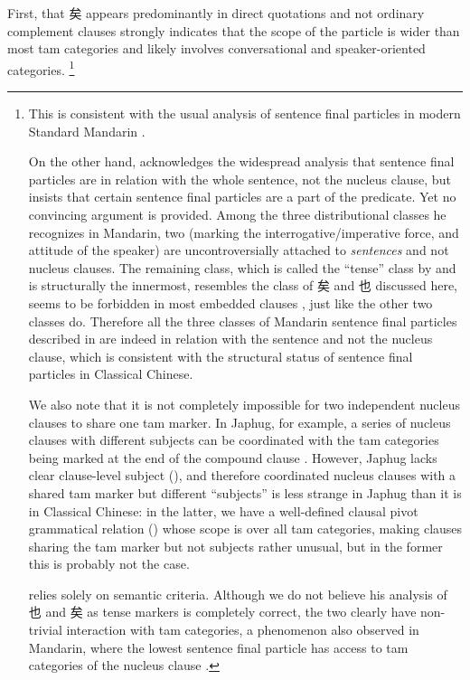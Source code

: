 \documentclass[UTF8, a4paper, oneside, scheme=plain, 12pt]{ctexrep}
\newcommand*{\citesec}[1]{\S~{#1}}
\newcommand*{\citepage}[1]{p.~{#1}}
\newcommand*{\citepages}[1]{pp.~{#1}}
\begin{document}
First, that 矣 appears predominantly in direct quotations and not ordinary complement clauses
strongly indicates that the scope of the particle is wider than most \ac{tam} categories and likely involves conversational and speaker-oriented categories.%
\footnote{
    This is consistent with the usual analysis of sentence final particles 
    in modern Standard Mandarin
    \citep{paul2014particles,pan2021sentence}.

    On the other hand, \citet[\citepage{233}]{zhudexigrammar} acknowledges the widespread analysis that sentence final particles are in relation with the whole sentence, not the nucleus clause,
    but insists that certain sentence final particles are a part of the predicate.
    Yet no convincing argument is provided.
    Among the three distributional classes he recognizes in Mandarin,
    two (marking the interrogative/imperative force, and attitude of the speaker)
    are uncontroversially attached to \emph{sentences} and not nucleus clauses.
    The remaining class, which is called the ``tense'' class by \citet{zhudexigrammar}
    and is structurally the innermost,
    resembles the class of 矣 and 也 discussed here,
    seems to be forbidden in most embedded clauses \citep{deng2010},
    just like the other two classes do.
    Therefore all the three classes of Mandarin sentence final particles described in \citet{zhudexigrammar}
    are indeed in relation with the sentence and not the nucleus clause,
    which is consistent with the structural status of sentence final particles in Classical Chinese.
    
    We also note that it is not completely impossible for two independent nucleus clauses to share one \ac{tam} marker.
    In Japhug, for example, a series of nucleus clauses with different subjects can be coordinated with the \ac{tam} categories being marked at the end of the compound clause \citep[\citepages{1090-1091}]{jacques2021grammar}.
    However, Japhug lacks clear clause-level subject
    (\citealt[\citesec{2.5.3}]{jacques2021grammar}),
    and therefore coordinated nucleus clauses with a shared \ac{tam} marker but different ``subjects'' is less strange in Japhug than it is in Classical Chinese:
    in the latter, we have a well-defined clausal pivot grammatical relation () whose scope is over all \ac{tam} categories,
    making clauses sharing the \ac{tam} marker but not subjects rather unusual,
    but in the former this is probably not the case.

    \citet[\citepages{443-445}]{meiguang2018} relies solely on semantic criteria.
    Although we do not believe his analysis of 也 and 矣 as tense markers is completely correct,
    the two clearly have non-trivial interaction with \ac{tam} categories,
    a phenomenon also observed in Mandarin,
    where the lowest sentence final particle has access to \ac{tam} categories of the nucleus clause \citep[\citepage{258}]{paul2014new}.
}
\end{document}
